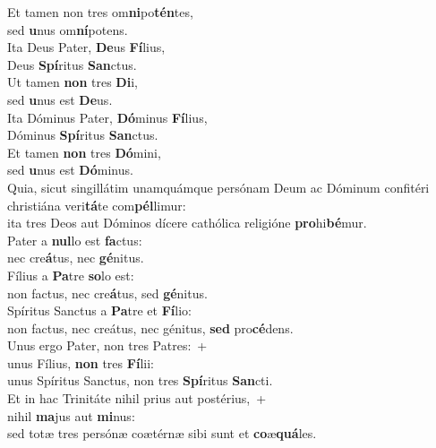 \evenverse Et tamen non tres om\textbf{ni}po\textbf{tén}tes,~\*\\
\evenverse sed \textbf{u}nus om\textbf{ní}potens.\\
\oddverse Ita Deus Pater, \textbf{De}us \textbf{Fí}lius,~\*\\
\oddverse Deus \textbf{Spí}ritus \textbf{San}ctus.\\
\evenverse Ut tamen \textbf{non} tres \textbf{Di}i,~\*\\
\evenverse sed \textbf{u}nus est \textbf{De}us.\\
\oddverse Ita Dóminus Pater, \textbf{Dó}minus \textbf{Fí}lius,~\*\\
\oddverse Dóminus \textbf{Spí}ritus \textbf{San}ctus.\\
\evenverse Et tamen \textbf{non} tres \textbf{Dó}mini,~\*\\
\evenverse sed \textbf{u}nus est \textbf{Dó}minus.\\
\oddverse Quia, sicut singillátim unamquámque persónam Deum ac Dóminum confitéri christiána veri\textbf{tá}te com\textbf{pél}limur:~\*\\
\oddverse ita tres Deos aut Dóminos dícere cathólica religióne \textbf{pro}hi\textbf{bé}mur.\\
\evenverse Pater a \textbf{nul}lo est \textbf{fa}ctus:~\*\\
\evenverse nec cre\textbf{á}tus, nec \textbf{gé}nitus.\\
\oddverse Fílius a \textbf{Pa}tre \textbf{so}lo est:~\*\\
\oddverse non factus, nec cre\textbf{á}tus, sed \textbf{gé}nitus.\\
\evenverse Spíritus Sanctus a \textbf{Pa}tre et \textbf{Fí}lio:~\*\\
\evenverse non factus, nec creátus, nec génitus, \textbf{sed} pro\textbf{cé}dens.\\
\oddverse Unus ergo Pater, non tres Patres:~+\\
\oddverse  unus Fílius, \textbf{non} tres \textbf{Fí}lii:~\*\\
\oddverse unus Spíritus Sanctus, non tres \textbf{Spí}ritus \textbf{San}cti.\\
\evenverse Et in hac Trinitáte nihil prius aut postérius,~+\\
\evenverse  nihil \textbf{ma}jus aut \textbf{mi}nus:~\*\\
\evenverse sed totæ tres persónæ coætérnæ sibi sunt et \textbf{co}æ\textbf{quá}les.\\
